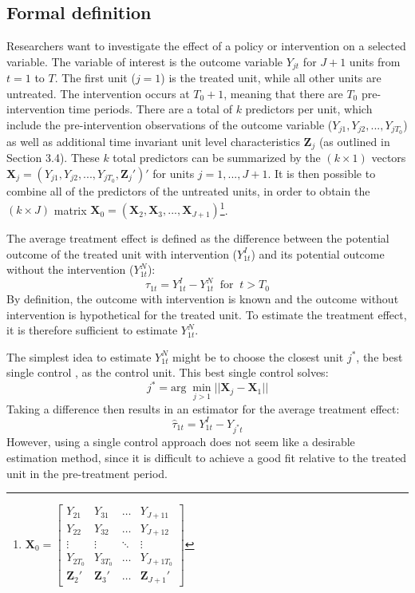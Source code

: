 \documentclass{scrbook}
\begin{document}
\subsection*{Formal definition}

Researchers want to investigate the effect of a policy or intervention
on a selected variable. The variable of interest is the outcome variable
\(Y_{jt}\) for \(J + 1\) units from \(t=1\) to \(T\). The first unit
(\(j = 1\)) is the treated unit, while all other units are untreated.
The intervention occurs at \(T_{0}+1\), meaning that there are \(T_{0}\)
pre-intervention time periods. There are a total of \(k\) predictors per
unit, which include the pre-intervention observations of the outcome
variable (\(Y_{j1},Y_{j2},...,Y_{jT_{0}}\)) as well as additional time
invariant unit level characteristics \(\mathbf{Z}_{j}\) (as outlined in
Section 3.4). These \(k\) total predictors can be summarized by the
\((k\times 1)\) vectors
\(\mathbf{X}_{j}=(Y_{j1},Y_{j2},...,Y_{jT_{0}},\mathbf{Z}_{j}')'\) for
units \(j=1,...,J + 1\). It is then possible to combine all of the
predictors of the untreated units, in order to obtain the
\((k\times J)\) matrix
\(\mathbf{X}_{0}=(\mathbf{X}_{2},\mathbf{X}_{3},...,\mathbf{X}_{J + 1})\)\footnote{\(\mathbf{X}_0=
\begin{bmatrix}
Y_{21} & Y_{31} & \dots & Y_{J+11}\\
Y_{22} & Y_{32} & \dots & Y_{J+12}\\
\vdots & \vdots & \ddots & \vdots\\
Y_{2T_{0}} & Y_{3T_{0}} & \dots & Y_{J+1T_{0}}\\
\mathbf{Z}_{2}' & \mathbf{Z}_{3}' & \dots & \mathbf{Z}_{J + 1}'
\end{bmatrix}\)}.

The average treatment effect is defined as the difference between the
potential outcome of the treated unit with intervention (\(Y_{1t}^{I}\))
and its potential outcome without the intervention (\(Y_{1t}^{N}\)):
\begin{equation}
\tau_{1t}=Y_{1t}^{I}-Y_{1t}^{N}\; \; \text{for}\; \; t>T_{0}
\end{equation} By definition, the outcome with intervention is known and
the outcome without intervention is hypothetical for the treated unit.
To estimate the treatment effect, it is therefore sufficient to estimate
\(Y_{1t}^{N}\).

The simplest idea to estimate \(Y_{1t}^{N}\) might be to choose the
closest unit \(j^{*}\), the best single control
\parencite{doudchenko_balancing_2016}, as the control unit. This best
single control solves: \begin{equation}
j^{*}=\text{arg}\; \min_{j>1}\vert\vert\mathbf{X}_{j}-\mathbf{X}_{1}\vert\vert
\end{equation} Taking a difference then results in an estimator for the
average treatment effect: \begin{equation}
\hat{\tau}_{1t}=Y_{1t}^{I}-Y_{j^{*}t}
\end{equation} However, using a single control approach does not seem
like a desirable estimation method, since it is difficult to achieve a
good fit relative to the treated unit in the pre-treatment period.
\end{document}
